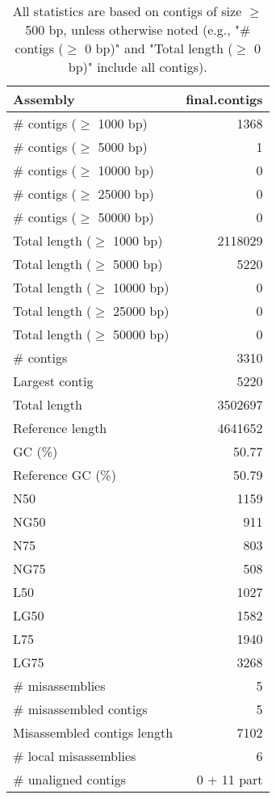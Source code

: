 \documentclass[12pt,a4paper]{article}
\begin{document}
\begin{table}[ht]
\begin{center}
\caption{All statistics are based on contigs of size $\geq$ 500 bp, unless otherwise noted (e.g., "\# contigs ($\geq$ 0 bp)" and "Total length ($\geq$ 0 bp)" include all contigs).}
\begin{tabular}{|l*{1}{|r}|}
\hline
Assembly & final.contigs \\ \hline
\# contigs ($\geq$ 1000 bp) & 1368 \\ \hline
\# contigs ($\geq$ 5000 bp) & 1 \\ \hline
\# contigs ($\geq$ 10000 bp) & 0 \\ \hline
\# contigs ($\geq$ 25000 bp) & 0 \\ \hline
\# contigs ($\geq$ 50000 bp) & 0 \\ \hline
Total length ($\geq$ 1000 bp) & 2118029 \\ \hline
Total length ($\geq$ 5000 bp) & 5220 \\ \hline
Total length ($\geq$ 10000 bp) & 0 \\ \hline
Total length ($\geq$ 25000 bp) & 0 \\ \hline
Total length ($\geq$ 50000 bp) & 0 \\ \hline
\# contigs & 3310 \\ \hline
Largest contig & 5220 \\ \hline
Total length & 3502697 \\ \hline
Reference length & 4641652 \\ \hline
GC (\%) & 50.77 \\ \hline
Reference GC (\%) & 50.79 \\ \hline
N50 & 1159 \\ \hline
NG50 & 911 \\ \hline
N75 & 803 \\ \hline
NG75 & 508 \\ \hline
L50 & 1027 \\ \hline
LG50 & 1582 \\ \hline
L75 & 1940 \\ \hline
LG75 & 3268 \\ \hline
\# misassemblies & 5 \\ \hline
\# misassembled contigs & 5 \\ \hline
Misassembled contigs length & 7102 \\ \hline
\# local misassemblies & 6 \\ \hline
\# unaligned contigs & 0 + 11 part \\ \hline

\end{tabular}
\end{center}
\end{table}
\end{document}
